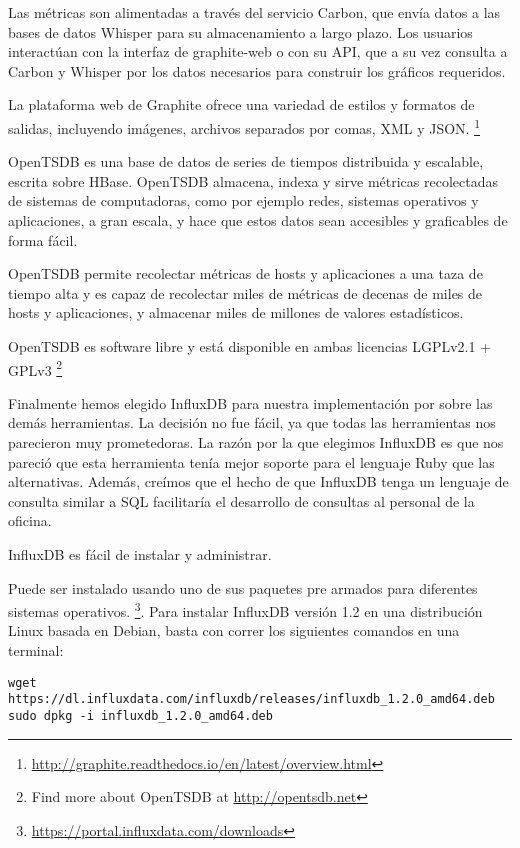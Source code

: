 Las métricas son alimentadas a través del servicio Carbon, que envía datos a las
bases de datos Whisper para su almacenamiento a largo plazo. Los usuarios
interactúan con la interfaz de graphite-web o con su API, que a su vez consulta
a Carbon y Whisper por los datos necesarios para construir los gráficos
requeridos.


La plataforma web de Graphite ofrece una variedad de estilos y formatos de
salidas, incluyendo imágenes, archivos separados por comas, XML y JSON.
\footnote{
  \url{http://graphite.readthedocs.io/en/latest/overview.html}
}

OpenTSDB es una base de datos de series de tiempos distribuida y escalable,
escrita sobre HBase. OpenTSDB almacena, indexa y sirve métricas recolectadas de
sistemas de computadoras, como por ejemplo redes, sistemas operativos y
aplicaciones, a gran escala, y hace que estos datos sean accesibles y
graficables de forma fácil.

OpenTSDB permite recolectar métricas de hosts y aplicaciones a una taza de
tiempo alta y es capaz de recolectar miles de métricas de decenas de miles de
hosts y aplicaciones, y almacenar miles de millones de valores estadísticos.

OpenTSDB es software libre y está disponible en ambas licencias LGPLv2.1 + GPLv3
\footnote{Find more about OpenTSDB at \url{http://opentsdb.net}}

Finalmente hemos elegido InfluxDB para nuestra implementación por sobre las
demás herramientas. La decisión no fue fácil, ya que todas las herramientas nos
parecieron muy prometedoras. La razón por la que elegimos InfluxDB es que nos
pareció que esta herramienta tenía mejor soporte para el lenguaje Ruby que las
alternativas. Además, creímos que el hecho de que InfluxDB tenga un lenguaje de
consulta similar a SQL facilitaría el desarrollo de consultas al personal de la
oficina.

InfluxDB es fácil de instalar y administrar.

Puede ser instalado usando uno de sus paquetes pre armados para diferentes
sistemas operativos. \footnote{\url{https://portal.influxdata.com/downloads}}.
Para instalar InfluxDB versión 1.2 en una distribución Linux basada en Debian,
basta con correr los siguientes comandos en una terminal:

\begin{lstlisting}
wget https://dl.influxdata.com/influxdb/releases/influxdb_1.2.0_amd64.deb
sudo dpkg -i influxdb_1.2.0_amd64.deb
\end{lstlisting}

